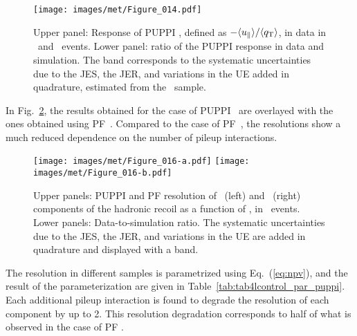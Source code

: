 \begin{figure}[!htp]
  \centering
   \texttt{[image: images/met/Figure\_014.pdf]}
  \caption{Upper panel: Response of PUPPI \ptmiss, defined as $-\langle u_\Vert \rangle /\langle {q}_{\mathrm T} \rangle$, in data in \Zmm\ and \Zee\ events. Lower panel: ratio of the PUPPI \ptmiss response in data and simulation. The band corresponds to the systematic uncertainties due to the JES, the JER, and variations in the UE added in quadrature, estimated from the \Zee\ sample.}
  \label{fig:response_puppi}
\end{figure}
In Fig.~\ref{fig:Res_vs_PileUpHighPU}, the results obtained for the case of PUPPI \ptmiss\ are overlayed with the ones obtained using PF~\ptmiss. 
Compared to the case of PF~\ptmiss, the resolutions show a much reduced dependence on the number of pileup interactions.
\begin{figure}[!htp]
  \centering
   \texttt{[image: images/met/Figure\_016-a.pdf]}
   \texttt{[image: images/met/Figure\_016-b.pdf]}
   \caption{Upper panels: PUPPI and PF \ptmiss resolution of \upar\ (left) and \uperp\ (right) components of the hadronic recoil as a function of \nvtx, in \Zmm\ events. Lower panels: Data-to-simulation ratio. The systematic uncertainties due to the JES, the JER, and variations in the UE are added in quadrature and displayed with a band.}
   \label{fig:Res_vs_PileUpHighPU}
\end{figure}
The resolution in different samples is parametrized using Eq.~(\ref{eq:npv}), and the result of the parameterization are given in Table~\ref{tab:tab4lcontrol_par_puppi}. 
Each additional pileup interaction is found to degrade the resolution of each component by up to 2\GeV. This resolution degradation corresponds to half of what is observed in the case of PF \ptmiss.

